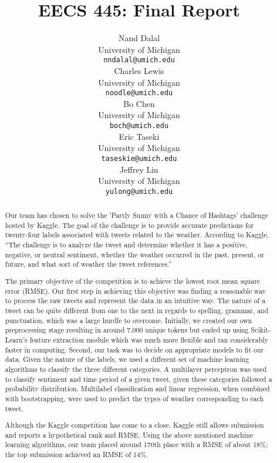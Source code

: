 \documentclass{article}
\title{EECS 445: Final Report}
\author{
Nand Dalal \\
University of Michigan \\
\texttt{nndalal@umich.edu} \\
\And
Charles Lewis \\
University of Michigan \\
\texttt{noodle@umich.edu} \\
\And
Bo Chen \\
University of Michigan \\
\texttt{boch@umich.edu} \\
\And
Eric Taseki \\
University of Michigan \\
\texttt{taseskie@umich.edu} \\
\And
Jeffrey Lin \\
University of Michigan \\
\texttt{yulong@umich.edu} \\
}
\begin{document}
\maketitle

\begin{abstract}
Our team has chosen to solve the 'Partly Sunny with a Chance of Hashtags' challenge hosted by Kaggle. The goal of the challenge is to provide accurate predictions for twenty-four labels associated with tweets related to the weather. According to Kaggle, ``The challenge is to analyze the tweet and determine whether it has a positive, negative, or neutral sentiment, whether the weather occurred in the past, present, or future, and what sort of weather the tweet references.''

The primary objective of the competition is to achieve the lowest root mean square error (RMSE). Our first step in achieving this objective was finding a reasonable way to process the raw tweets and represent the data in an intuitive way. The nature of a tweet can be quite different from one to the next in regards to spelling, grammar, and punctuation, which was a large hurdle to overcome. Initially, we created our own preprocessing stage resulting in around 7,000 unique tokens but ended up using Scikit-Learn's feature extraction module which was much more flexible and ran considerably faster in computing. Second, our task was to decide on appropriate models to fit our data. Given the nature of the labels, we used a different set of machine learning algorithms to classify the three different categories. A multilayer perceptron was used to classify sentiment and time period of a given tweet, given these categories followed a probability distribution. Multilabel classification and linear regression, when combined with bootstrapping, were used to predict the types of weather corresponding to each tweet.

Although the Kaggle competition has come to a close, Kaggle still allows submission and reports a hypothetical rank and RMSE. Using the above mentioned machine learning algorithms, our team placed around 170th place with a RMSE of about 18\%; the top submission achieved an RMSE of 14\%.
\end{abstract}

\newpage
\end{document}
